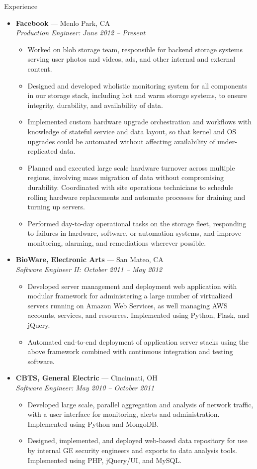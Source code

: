 \documentclass[11pt,oneside]{article}
\newenvironment{ressection}[1]{
	\vspace{8pt}
	{\fontfamily{phv}\selectfont\Large#1}
	\begin{itemize}
	\vspace{3pt}
}{
	\end{itemize}
}
\newcommand{\ressubitem}[1]{
	\vspace{-1pt}
	\item \begin{flushleft} #1 \end{flushleft}
}
\newcommand{\resbigitem}[3]{
	\vspace{-5pt}
	\item
	\textbf{#1} --- #2 \\
	\textit{#3}
}
\newenvironment{ressubsec}[3]{
	\resbigitem{#1}{#2}{#3}
	\vspace{-2pt}
	\begin{itemize}
}{
	\end{itemize}
}
\begin{document}
\begin{ressection}{Experience}

	\begin{ressubsec}{Facebook}{Menlo Park, CA}
	{Production Engineer: June 2012 -- Present}
		\ressubitem{Worked on blob storage team, responsible for backend storage systems
            serving user photos and videos, ads, and other internal and external content.}
		\ressubitem{Designed and developed wholistic monitoring system for all components
            in our storage stack, including hot and warm storage systems, to ensure integrity,
            durability, and availability of data.}
		\ressubitem{Implemented custom hardware upgrade orchestration and workflows with
            knowledge of stateful service and data layout, so that kernel and OS upgrades
            could be automated without affecting availability of under-replicated data.}
		\ressubitem{Planned and executed large scale hardware turnover across multiple
            regions, involving mass migration of data without compromising durability.
            Coordinated with site operations technicians to schedule rolling hardware
            replacements and automate processes for draining and turning up servers.}
		\ressubitem{Performed day-to-day operational tasks on the storage fleet, responding
            to failures in hardware, software, or automation systems, and improve monitoring,
            alarming, and remediations wherever possible.}
	\end{ressubsec}

	\begin{ressubsec}{BioWare, Electronic Arts}{San Mateo, CA}
	{Software Engineer II: October 2011 -- May 2012}
		\ressubitem{Developed server management and deployment web application with
		modular framework for administering a large number of virtualized servers
		running on Amazon Web Services, as well managing AWS accounts, services, and
		resources.  Implemented using Python, Flask, and jQuery.}
		\ressubitem{Automated end-to-end deployment of application server stacks using
			the above framework combined with continuous integration and testing software.}
	\end{ressubsec}

	\begin{ressubsec}{CBTS, General Electric}{Cincinnati, OH}
	{Software Engineer: May 2010 -- October 2011}
		\ressubitem{Developed large scale, parallel aggregation and analysis of network
		traffic, with a user interface for monitoring, alerts and administration.
		Implemented using Python and MongoDB.}
		\ressubitem{Designed, implemented, and deployed web-based data repository
		for use by internal GE security engineers and exports to data analysis tools.
		Implemented using PHP, jQuery/UI, and MySQL.}
	\end{ressubsec}


\end{ressection}
\end{document}
